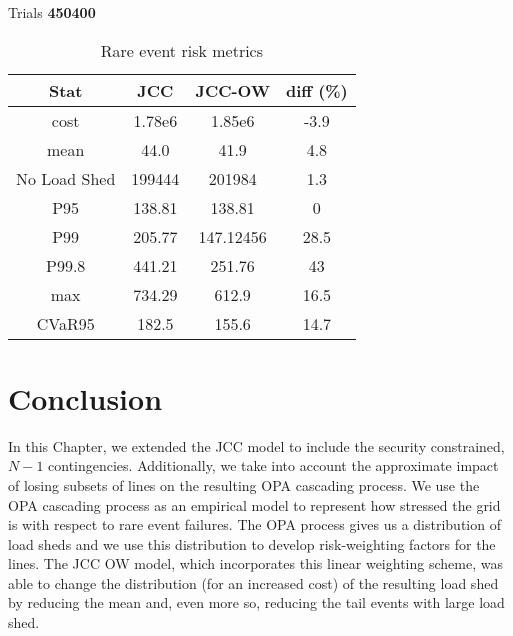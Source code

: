 \begin{table}
\centering
Trials \textbf{450400}

\begin{tabular}{|c |  c c | c|}
\hline
Stat & JCC & JCC-OW & diff (\%) \\
\hline
cost&1.78e6 & 1.85e6 & \alert{-3.9} \\
mean&44.0&41.9 & 4.8   \\
No Load Shed&199444 & 201984 & 1.3 \\
P95& 138.81& 138.81  &  0         \\
P99& 205.77& 147.12456 &  28.5        \\
P99.8& 441.21& 251.76   &  43      \\
max& 734.29& 612.9      &  16.5            \\
CVaR95 & 182.5 & 155.6 & 14.7 \\
\hline
\end{tabular}
\caption{Rare event risk metrics}\label{rare_event_risk_metrics}
\end{table}


\section{Conclusion}
In this Chapter, we extended the JCC model to include the security constrained, $N-1$ contingencies.  Additionally, we take into account the approximate impact of losing subsets of lines on the resulting OPA cascading process.  We use the OPA cascading process as an empirical model to represent how stressed the grid is with respect to rare event failures.  The OPA process gives us a distribution of load sheds and we use this distribution to develop risk-weighting factors for the lines.  The JCC OW model, which incorporates this linear weighting scheme, was able to change the distribution (for an increased cost) of the resulting load shed by reducing the mean and, even more so, reducing the tail events with large load shed.
